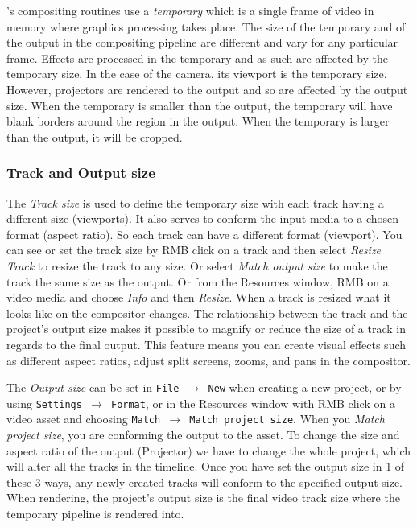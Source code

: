 \CGG{}'s compositing routines use a \textit{temporary} which is a single frame of video in
memory where graphics processing takes place. The size of the temporary and of the output in
the compositing pipeline are different and vary for any particular frame.  Effects are processed in
the temporary and as such are affected by the temporary size.  In the case of the camera, its
viewport is the temporary size. However, projectors are rendered to the output and so are affected
by the output size. When the temporary is smaller than the output, the temporary will have blank
borders around the region in the output.  When the temporary is larger than the output, it will be
cropped.

\subsubsection*{Track and Output size}%
\label{ssub:track_size}

The \textit{Track size} is used to define the temporary size with each track having a different size (viewports). It also serves to conform the input media to a chosen format (aspect ratio). So each track can have a different format (viewport).
You can see or set the track size by RMB click on a track and then select \emph{Resize Track} to resize
the track to any size. Or select \emph{Match output size} to make the track the same size as the
output. Or from the Resources window, RMB on a video media and choose \textit{Info} and then \textit{Resize}. When a track is resized what it looks like on the compositor changes.  The relationship
between the track and the project's output size makes it possible to magnify or reduce the size of
a track in regards to the final output. This feature means you can create visual effects such as different aspect ratios, adjust split screens, zooms, and pans in the compositor.

The \textit{Output size} can be set in \texttt{File $\rightarrow$ New} when creating a new project,
or by using \texttt{Settings $\rightarrow$ Format}, or in the Resources window with RMB click on
a video asset and choosing \texttt{Match $\rightarrow$ Match project size}. When you \emph{Match project size}, you
are conforming the output to the asset. To change the size and aspect ratio of the output (Projector) we have to change the whole project, which will alter all the tracks in the timeline. Once you have set the output size in 1 of these 3 ways,
any newly created tracks will conform to the specified output size.  When rendering, the project's
output size is the final video track size where the temporary pipeline is rendered into. 

